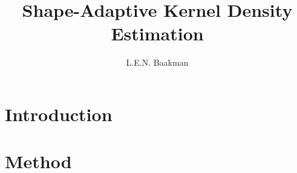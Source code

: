 \documentclass[10pt, a4paper, twocolumn]{article}
\title{Shape-Adaptive Kernel Density Estimation}
\author{L.E.N. Baakman}
\begin{document}
\maketitle



\section{Introduction}
\label{s:introduction}


\section{Method}
\label{s:method}
% 
	
\printbibliography
\end{document}
